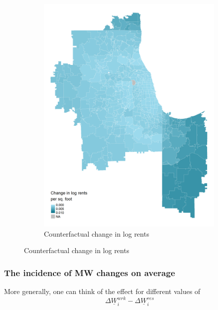 \documentclass[aspectratio=169, t]{beamer}
\newcommand{\MW}{\underline{W}}
\begin{document}
\begin{frame}
\begin{figure}
\begin{subfigure}{0.33\textwidth}
                         \includegraphics[width = 0.99\textwidth]{counterfactuals/output/chicago_d_ln_rents.png}
            \caption*{Counterfactual change in log rents}
        \end{subfigure}
    \end{figure}    
\end{frame}

\begin{frame}
    \frametitle{The incidence of MW changes on average}
    
    \vspace{3mm}

    \pause
    \vspace{3mm}

    More generally, one can think of the effect for different values of 
    $$
        \Delta \MW_i^{wrk} - \Delta \MW_i^{res}
    $$
\end{frame}
\end{document}
